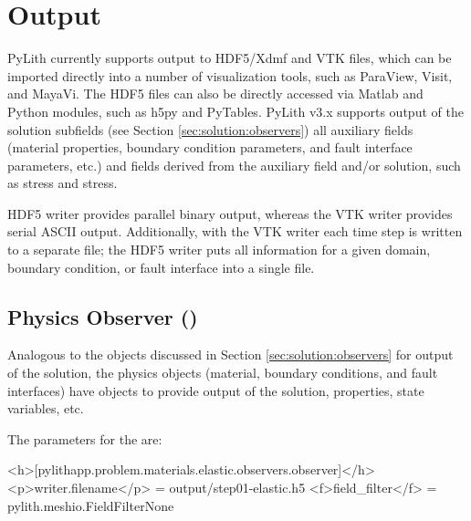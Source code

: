 \section{Output}

PyLith currently supports output to HDF5/Xdmf and VTK files, which can
be imported directly into a number of visualization tools, such as
ParaView, Visit, and MayaVi. The HDF5 files can also be directly
accessed via Matlab and Python modules, such as h5py and
PyTables. PyLith v3.x supports output of the solution subfields (see
Section \vref{sec:solution:observers}) all auxiliary fields
(material properties, boundary condition parameters, and fault interface
parameters, etc.) and fields derived from the auxiliary field and/or
solution, such as stress and stress.

HDF5 writer provides parallel binary output, whereas the VTK writer
provides serial ASCII output. Additionally, with the VTK writer each
time step is written to a separate file; the HDF5 writer puts all
information for a given domain, boundary condition, or fault interface
into a single file.


\subsection{Physics Observer ()}

Analogous to the  objects discussed in Section
\vref{sec:solution:observers} for output of the solution, the physics
objects (material, boundary conditions, and fault interfaces) have
 objects to provide output of the solution,
properties, state variables, etc. 

The parameters for the  are:
\begin{inventory}
\end{inventory}

\begin{cfg}
<h>[pylithapp.problem.materials.elastic.observers.observer]</h>
<p>writer.filename</p> = output/step01-elastic.h5
<f>field_filter</f> = pylith.meshio.FieldFilterNone
\end{cfg}

